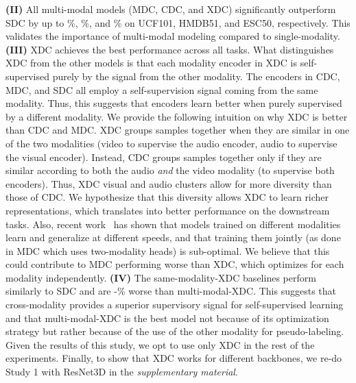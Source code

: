 \documentclass{article}
\begin{document}
\textbf{{(II)}} All multi-modal models (MDC, CDC, and XDC) significantly outperform SDC by up to \%, \%, and \% on UCF101, HMDB51, and ESC50, respectively. This validates the importance of multi-modal modeling compared to single-modality.
\textbf{{(III)}} XDC achieves the best performance across all tasks. What distinguishes XDC from the other models is that each modality encoder in XDC is self-supervised purely by the signal from the other modality. The encoders in CDC, MDC, and SDC all employ a self-supervision signal coming from the same modality. Thus, this suggests that encoders learn better when purely supervised by a different modality. 
We provide the following intuition on why XDC is better than CDC and MDC. XDC groups samples together when they are similar in one of the two modalities (video to supervise the audio encoder, audio to supervise the visual encoder). Instead, CDC groups samples together only if they are similar according to both the audio \textit{and} the video modality (to supervise both encoders). Thus, XDC visual and audio clusters allow for more diversity than those of CDC. We hypothesize that this diversity allows XDC to learn richer representations, which translates into better performance on the downstream tasks. Also, recent work~\cite{Wang_2020_CVPR} has shown that models trained on different modalities learn and generalize at different speeds, and that training them jointly (as done in MDC which uses two-modality heads) is sub-optimal. We believe that this could contribute to MDC performing worse than XDC, which optimizes for each modality independently.
\textbf{{(IV)}} The same-modality-XDC baselines perform similarly to SDC and are -\% worse than multi-modal-XDC. This suggests that cross-modality provides a superior supervisory signal for self-supervised learning and that multi-modal-XDC is the best model not because of its optimization strategy but rather because of the use of the other modality for pseudo-labeling. Given the results of this study, we opt to use only XDC in the rest of the experiments.
Finally, to show that XDC works for different backbones, we re-do Study 1 with ResNet3D in the \emph{supplementary material}.
\end{document}
